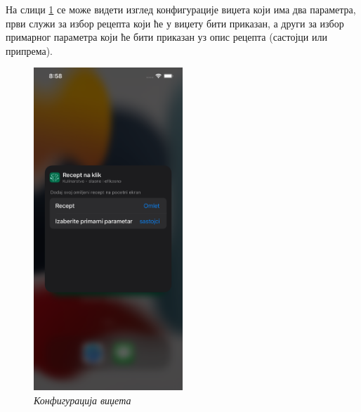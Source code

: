 \documentclass[12pt,oneside]{memoir}
\begin{document}
\indent На слици \ref{slika:widget_configuration} се може видети изглед конфигурације виџета који има два параметра, први служи за избор рецепта који ће у виџету бити приказан, а други за избор примарног параметра који ће бити приказан уз опис рецепта (састојци или припрема).

\begin{figure}[H]
\includegraphics[width=0.5\textwidth]{images/Widget_configuration.png}
\centering
\caption{\textit{Конфигурација виџета}}
\label{slika:widget_configuration}
\end{figure}
\end{document}
